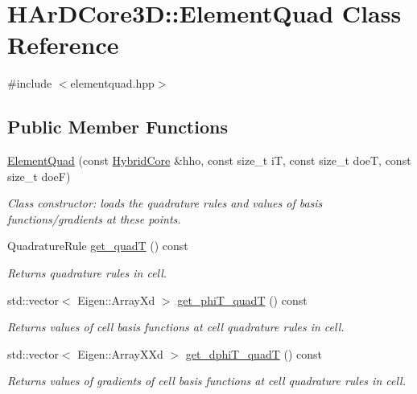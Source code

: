\hypertarget{classHArDCore3D_1_1ElementQuad}{}\section{H\+Ar\+D\+Core3D\+:\+:Element\+Quad Class Reference}
\label{classHArDCore3D_1_1ElementQuad}


{\ttfamily \#include $<$elementquad.\+hpp$>$}

\subsection*{Public Member Functions}
\begin{DoxyCompactItemize}
\item 
\hyperlink{classHArDCore3D_1_1ElementQuad_a0d27ba99f9f3e6f2a3e5311e6be19eba}{Element\+Quad} (const \hyperlink{classHArDCore3D_1_1HybridCore}{Hybrid\+Core} \&hho, const size\+\_\+t iT, const size\+\_\+t doeT, const size\+\_\+t doeF)
\begin{DoxyCompactList}\small\item\em Class constructor\+: loads the quadrature rules and values of basis functions/gradients at these points. \end{DoxyCompactList}\item 
Quadrature\+Rule \hyperlink{group__HybridCore_ga9676c87f42764a058c9d7aecd2ce44cd}{get\+\_\+quadT} () const
\begin{DoxyCompactList}\small\item\em Returns quadrature rules in cell. \end{DoxyCompactList}\item 
std\+::vector$<$ Eigen\+::\+Array\+Xd $>$ \hyperlink{group__HybridCore_gaafce6cb00f061fe1159a9972b73d3bb9}{get\+\_\+phi\+T\+\_\+quadT} () const
\begin{DoxyCompactList}\small\item\em Returns values of cell basis functions at cell quadrature rules in cell. \end{DoxyCompactList}\item 
std\+::vector$<$ Eigen\+::\+Array\+X\+Xd $>$ \hyperlink{group__HybridCore_gab0450891cb0d96686256c31e87948374}{get\+\_\+dphi\+T\+\_\+quadT} () const
\begin{DoxyCompactList}\small\item\em Returns values of gradients of cell basis functions at cell quadrature rules in cell. \end{DoxyCompactList}\item 

\end{DoxyCompactItemize}
